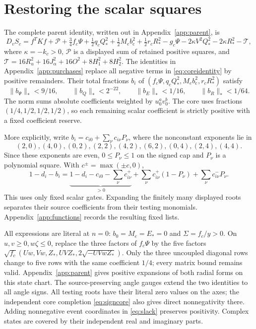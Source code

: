 \documentclass[10pt]{article}
\newcommand{\half}{\tfrac12}
\newcommand{\bc}{b_{\mathrm c}}
\newcommand{\Zc}{Z_*}
\newcommand{\Qh}{Q_*}
\newcommand{\Rh}{R_*}
\newcommand{\Ps}{\Psi}
\newcommand{\calP}{\mathcal P}
\begin{document}
\section{Restoring the scalar squares}
The complete parent identity, written out in Appendix~\ref{app:parent}, is
\begin{equation}
 D_vS_c=f^TKf+\calP+
 \tfrac34 f_c\Ps+\half q_c\Qh^2+\half M_e\bc^2+\half r_c\Rh^2
       -g_c\Ps-2\kappa V^2\Qh^2-2\kappa\Rh^2-\mathcal T ,
 \label{eq:coreidentity}
\end{equation}
where $\kappa=-k_c>0$, $\calP$ is a displayed sum of retained positive
squares, and
$\mathcal T=16R_u^2+16J_\alpha^2+16O^2+8H_1^2+8H_2^2$.
The identities in Appendix~\ref{app:purchases} replace all negative terms
in \eqref{eq:coreidentity} by positive remainders. Their total fractions
$b_i$ of $(f_c\Ps,q_c\Qh^2,M_e\bc^2,r_c\Rh^2)$ satisfy
\begin{equation}
 \|b_\Ps\|_*<9/16,\qquad \|b_Q\|_*<2^{-22},\qquad
 \|b_E\|_*<1/16,\qquad \|b_R\|_*<1/64 .
 \label{eq:totalbounds}
\end{equation}
The norm sums absolute coefficients weighted by $u_0^av_0^b$.
The core uses fractions $(1/4,1/2,1/2,1/2)$, so each remaining scalar
coefficient is strictly positive with a fixed coefficient reserve.

More explicitly, write $b_i=c_{i0}+\sum_\nu c_{i\nu}P_\nu$, where the
nonconstant exponents lie in
\[
 (2,0),(4,0),(0,2),(2,2),(4,2),(6,2),(0,4),(2,4),(4,4).
\]
Since these exponents are even, $0\leq P_\nu\leq1$ on the signed cap and
$P_\nu$ is a polynomial square. With $c^\pm=\max(\pm c,0)$,
\[
 1-d_i-b_i=
 \underbrace{1-d_i-c_{i0}-\sum_\nu c_{i\nu}^+}_{>0}
 +\sum_\nu c_{i\nu}^+(1-P_\nu)+\sum_\nu c_{i\nu}^-P_\nu .
\]
This uses only fixed scalar gates. Expanding the finitely many displayed
roots separates their source coefficients from their testing monomials.
Appendix~\ref{app:functions} records the resulting fixed lists.

All expressions are literal at $n=0$: $b_0=M_e=E_*=0$ and
$\Sigma=f_c/y>0$. On $u,v\geq0,w\zeta\leq0$, replace the three factors
of $f_c\Ps$ by the five factors
$\sqrt{f_c}(Uw,Vw,\Zc,UV\Zc,2\sqrt{-UVw\Zc})$.
Only the three uncoupled diagonal rows change to five rows with the same
coefficient $1/4$; every matrix bound remains valid.
Appendix~\ref{app:parent} gives positive expansions of both radial forms
on this state chart. The source-preserving angle gauges extend the two
identities to all angle signs. All testing roots have their literal zero
values on the axes; the independent core completion \eqref{eq:signcore}
also gives direct nonnegativity there.
Adding nonnegative event coordinates in \eqref{eq:slack} preserves positivity.
Complex states are covered by their independent real and imaginary parts.
\end{document}
